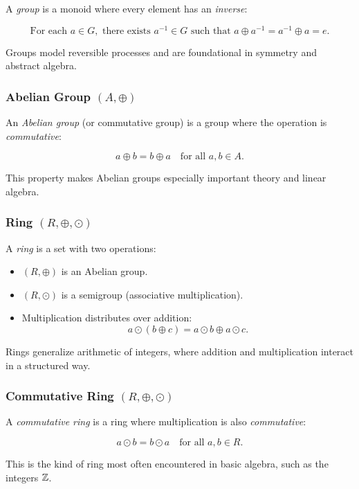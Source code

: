 A \emph{group} is a monoid where every element has an \emph{inverse}:

\[
  \text{For each } a \in G, \text{ there exists } a^{-1} \in G \text{ such that } a \oplus a^{-1} = a^{-1} \oplus a = e.
\]

Groups model reversible processes and are foundational in symmetry and abstract algebra.

\subsubsection{Abelian Group \texorpdfstring{\((A, \oplus)\)}{}}

An \emph{Abelian group} (or commutative group) is a group where the operation is \emph{commutative}:

\[
  a \oplus b = b \oplus a \quad \text{for all } a, b \in A.
\]

This property makes Abelian groups especially important theory and linear algebra.

\subsubsection{Ring \texorpdfstring{\((R, \oplus, \odot)\)}{}}

A \emph{ring} is a set with two operations:

\begin{itemize}
  \item \((R, \oplus)\) is an Abelian group.
  \item \((R, \odot)\) is a semigroup (associative multiplication).
  \item Multiplication distributes over addition:
  \[
  a \odot (b \oplus c) = a \odot b \oplus a \odot c.
  \]
\end{itemize}

Rings generalize arithmetic of integers, where addition and multiplication interact in a structured way.

\subsubsection{Commutative Ring \texorpdfstring{\((R, \oplus, \odot)\)}{}}

A \emph{commutative ring} is a ring where multiplication is also \emph{commutative}:

\[
  a \odot b = b \odot a \quad \text{for all } a, b \in R.
\]

This is the kind of ring most often encountered in basic algebra, such as the integers \(\mathbb{Z}\).

